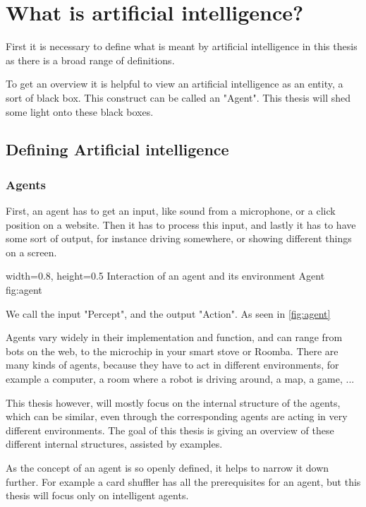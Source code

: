 \chapter{What is artificial intelligence?}
First it is necessary to define what is meant by artificial intelligence in this thesis as there is a broad range of definitions. \cite{definitionAI}

To get an overview it is helpful to view an artificial intelligence as an entity, a sort of black box. This construct can be called an "Agent". 
This thesis will shed some light onto these black boxes.

\section{Defining Artificial intelligence}
\subsection{Agents} \cite[p. 34]{MA}
First, an agent has to get an input, like sound from a microphone, or a click position on a website.
Then it has to process this input, and lastly it has to have some sort of output, for instance driving somewhere, or showing different things on a screen.

    {width=0.8\textwidth, height=0.5\textheight} %
    {Interaction of an agent and its environment}   %
    {Agent}   %
    {fig:agent}    %

We call the input "Percept", and the output "Action". As seen in \autoref{fig:agent}

Agents vary widely in their implementation and function, and can range from bots on the web, to the microchip in your smart stove or Roomba. 
There are many kinds of agents, because they have to act in different environments, for example a computer, a room where a robot is driving around, a map, a game, ...

This thesis however, will mostly focus on the internal structure of the agents, which can be similar, even through the corresponding agents are acting in very different environments.
The goal of this thesis is giving an overview of these different internal structures, assisted by examples.

As the concept of an agent is so openly defined, it helps to narrow it down further. For example a card shuffler has all the prerequisites for an agent, but this thesis will focus only on intelligent agents.

